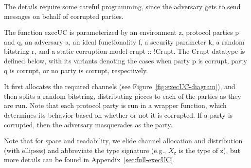The details require some careful programming, since the adversary gets to send messages on behalf of corrupted parties.

\noindent
The function \textsf{execUC} is parameterized by an environment \textsf{z},
protocol parties \textsf{p} and \textsf{q}, an adversary \textsf{a}, an ideal
functionality \textsf{f}, a security parameter \textsf{k}, a random bitstring
\textsf{r}, and a static corruption model \textsf{crupt :: !Crupt}. The
\textsf{Crupt} datatype is defined below, with its variants denoting the cases
when party \textsf{p} is corrupt, party \textsf{q} is corrupt, or no party is
corrupt, respectively.



\noindent It first allocates the required channels (see
Figure~\ref{fig:execUC-diagram}), and then splits a random bitstring,
distributing pieces to each of the parties as they are run.  Note that each
protocol party is run in a wrapper function, which determines its behavior based
on whether or not it is corrupted. If a party is corrupted, then the adversary
masquerades as the party.

Note that for space and readability, we elide channel allocation
and distribution (with ellipses) and abbreviate the type signature (e.g.,
$X_{\mathsf{z}}$ is the type of \textsf{z}), but more details can be found
in Appendix~\ref{sec:full-execUC}.


